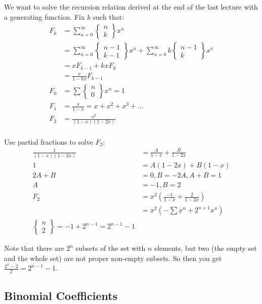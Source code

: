 \documentclass[12pt]{article}
\theoremstyle{definition}
\begin{document}
We want to solve the recursion relation derived at the end of the last lecture
with a generating function. Fix $k$ such that: 
\begin{align*}
F_k &= \sum_{n=0}^\infty \begin{Bmatrix}n \\ k \end{Bmatrix} x^n \\
&= \sum_{n=0}^\infty \begin{Bmatrix}n-1\\k-1 \end{Bmatrix} x^n +
\sum_{n=0}^\infty k\begin{Bmatrix}n-1 \\ k\end{Bmatrix}x^n\\
&= xF_{k-1} + kxF_k\\
&= \frac{x}{1 - kx}F_{k-1}\\
F_0 &= \sum \begin{Bmatrix} n \\ 0 \end{Bmatrix} x^n = 1\\
F_1 &= \frac{x}{1-x} = x + x^2 + x^3 + \ldots\\
F_2 &= \frac{x^2}{(1-x)(1-2x)}\\
\end{align*}

Use partial fractions to solve $F_2$: 
\begin{align*}
    \frac{1}{(1-x)(1-2x)} &= \frac{A}{1-x} + \frac{B}{1-2x}\\
    1 &= A(1-2x) + B(1-x) \\
    2A + B &= 0, B = -2A,A + B = 1\\
    A &= -1, B=2\\
    F_2 &= x^2\left(\frac{-1}{1-x} + \frac{2}{1-2x} \right)\\
    &= x^2\left(-\sum x^n + 2^{n+1}x^n\right)\\
    \begin{Bmatrix}n \\ 2\end{Bmatrix} = -1 + 2^{n-1} = 2^{n-1} - 1
\end{align*}

Note that there are $2^n$ subsets of the set with $n$ elements, but two (the
empty set and the whole set) are not proper non-empty subsets. So then you get
$\frac{2^n - 2}{2} = 2^{n-1} - 1$.\\

\subsection{Binomial Coefficients}
\end{document}
